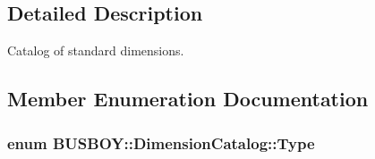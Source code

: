 \subsection{Detailed Description}
Catalog of standard dimensions. 

\subsection{Member Enumeration Documentation}
\hypertarget{classBUSBOY_1_1DimensionCatalog_a46badf3aaaba8629b5ccf8b63b4d1fe5}{
\subsubsection[{Type}]{\setlength{\rightskip}{0pt plus 5cm}enum {\bf BUSBOY::DimensionCatalog::Type}}}
\label{classBUSBOY_1_1DimensionCatalog_a46badf3aaaba8629b5ccf8b63b4d1fe5}
